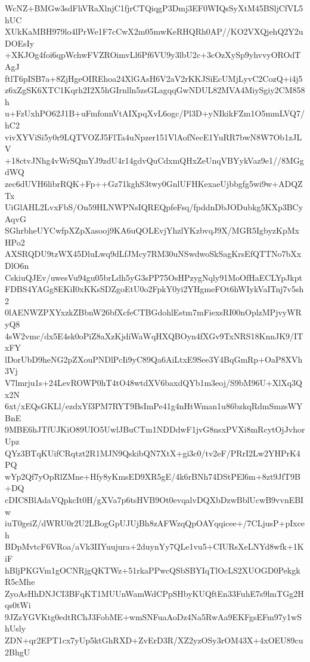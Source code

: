 WcNZ+BMGw3sdFhVRaXlnjC1fjrCTQiqgP3Dmj3EF0WIQsSyXtM45BSljCfVL5hUC
XUkKaMBH979lo4lPrWe1F7cCwX2m05mwKeRHQRh0AP//KO2VXQjehQ2Y2uDOEsIy
+XKJOg4foi6qpWchwFVZROimvLl6Pf6VU9y3lbU2c+3cOzXySp9yhvvyOROdTAgJ
ftlT6pISB7a+8ZjHgeOIREhoa24XlGAsH6V2aV2rKKJSiEcUMjLyvC2CozQ+i4j5
z6xZgSK6XTC1Kqrh2I2X5hGIrnlln5zsGLagqqGwNDUL82MVA4MiySgiy2CM858h
u+FzUxhPO62J1B+uFmfonnVtAIXpqXvL6ogc/Pl3D+yNIkikFZm1O5mmLVQ7/hC2
vivXYViSi5y0r9LQTVOZJ5FlTa4uNpzer151VlAofNecE1YuRR7bwN8W7Ob1zJLV
+18ctvJNhg4vWrSQmYJ9zdU4r14gdvQuCdxmQHxZeUnqVBYykVaz9e1//8MGgdWQ
zec6dUVH6librRQK+Fp++Gz71kghS3twy0GnlUFHKexaeUjbbgfg5wi9w+ADQZTx
UiGlAHL2LvxFbS/On59HLNWPNsIQREQpfeFsq/fpddnDbJODubkg5KXp3BCyAqvG
SGhrbheUYCwfpXZpXasooj9KA6uQOLEvjYhzlYKzbvqJ9X/MGR5IgbyzKpMxHPo2
AXSRQDU9tzWX45DluLwq9dLfJMcy7RM30uNSwdwoSkSagKrsEfQTTNo7bXxDlO6n
CskiuQJEv/uwesVu94gu05brLdh5yG3sPP75OsHPzygNqly91MoOfHaECLYpJkpt
FDBS4YAGg8EKiI0xKKsSDZgoEtU0o2FpkY0yi2YHgmeFOt6hWIykVaITnj7v5sh2
0lAENWZPXYxzkZBbnW26bfXcfeCTBGdohlEstm7mFiexsRI00nOplzMPjvyWRyQ8
4sW2vmc/dx5E4sk0oPiZ8aXzKjdiWaWqHXQBOyn4fXGv9TxNRS18KnnJK9/ITxFY
lDorUbD9heNG2pZXouPNDlPcIi9yC89Qa6AiLtxE9See3Y4BqGmRp+OaP8XVh3Vj
V7lmrju1s+24LevROWP0hT4tO48wtdXV6baxdQYb1m3eoj/S9bM96U+XlXq3Qx2N
6xt/xEQsGKLl/ezdxYf3PM7RYT9BsImPe41g4nHtWman1u86bzkqRdmSmzsWYBnE
9MBE6hJTfUJKiO89UIO5UwlJBuCTm1NDDdwF1jvG8nsxPVXi8mRcytOjJvhorUpz
QYz3BTqKUifCRqtzt2R1MJN9QskibQN7XtX+gi3c0/tv2eF/PRrI2Lw2YHPrK4PQ
wYp2Qf7yOpRlZMne+Hfy8yKmsED9XR5gE/4k6rBNh74DStPEl6m+8zt9JfT9B+DQ
cDIC8BlAdaVQpkcIt0H/gXVa7p6tsHVB9Ot0evqalvDQXbDzwBblUcwB9vvnEBIw
iuT0geiZ/dWRU0r2U2LBogGpUJUjBh8zAFWzqQpOAYqqicee+/7CLjusP+pIxceh
BDpMvtcF6VRoa/aVk3IIYuujura+2duynYy7QLe1vu5+CIURsXeLNYd8wfk+1KiF
hBljPKGVm1gOCNRjgQKTWz+51rkaPPwcQSbSBYIqTlOcLS2XUOGD0PekgkR5cMhe
ZyoAsHhDNJCI3BFqKT1MUUnWamWdCPpSHbyKUQftEn33FuhE7s9lmTGg2Hqs0tWi
9JZzYGVKtg0edtRChJ3FobME+wmSNFuaAoDz4Na5RwAa9EKFgsEFm97y1wShUsly
ZDN+qr2EPT1cx7yUp5ktGhRXD+ZvErD3R/XZ2yzOSy3rOM43X+4xOEU89cu2BhgU
